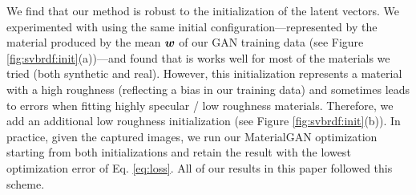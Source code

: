 We find that our method is robust to the initialization of the latent vectors. We experimented with using the same initial configuration---represented by the material produced by the mean $\bm{w}$ of our GAN training data (see Figure \ref{fig:svbrdf:init}(a))---and found that is works well for most of the materials we tried (both synthetic and real).
However, this initialization represents a material with a high roughness (reflecting a bias in our training data) and sometimes leads to errors when fitting highly specular / low roughness materials.
Therefore, we add an additional low roughness initialization (see Figure \ref{fig:svbrdf:init}(b)).
In practice, given the captured images, we run our MaterialGAN optimization starting from both initializations and retain the result with the lowest optimization error of Eq. \eqref{eq:loss}.
All of our results in this paper followed this scheme.

